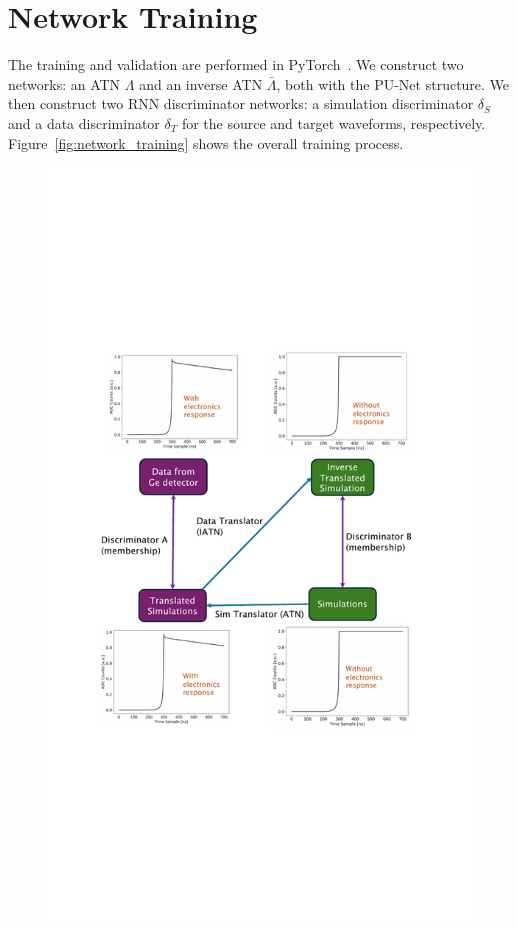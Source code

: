 \section{Network Training}
The training and validation are performed in PyTorch~\cite{pytorch}. We construct two networks: an ATN $\Lambda$ and an inverse ATN $\bar{\Lambda}$, both with the PU-Net structure. We then construct two RNN discriminator networks: a simulation discriminator $\delta_{S}$ and a data discriminator $\delta_{T}$ for the source and target waveforms, respectively. Figure~\ref{fig:network_training} shows the overall training process.
\clearpage
\begin{figure}[htb!]
    \centering
    \includegraphics[width=0.99\linewidth,trim={5.5pc 20pc 6.3pc 19pc},clip]{ch7/figs/cycle_gan_training.pdf}

\end{figure}
